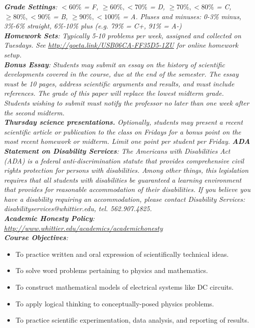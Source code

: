 \documentclass[10pt]{article}
\begin{document}
\textit{\textbf{Grade Settings}: $<60\%$ = F, $\geq 60\%, <70\%$ = D, $\geq 70\%, <80\%$ = C, $\geq 80\%, <90\%$ = B, $\geq 90\%, <100\%$ = A.  Pluses and minuses: 0-3\% minus, 3\%-6\% straight, 6\%-10\% plus (e.g. 79\% = C+, 91\% = A-)} \\
\textit{\textbf{Homework Sets}: Typically 5-10 problems per week, assigned and collected on Tuesdays.  See \url{http://goeta.link/USB06CA-FF35D5-1ZU} for online homework setup.} \\
\textit{\textbf{Bonus Essay}: Students may submit an essay on the history of scientific developments covered in the course, due at the end of the semester. The essay must be 10 pages, address scientific arguments and results, and must include references. The grade of this paper will replace the lowest midterm grade. Students wishing to submit must notify the professor no later than one week after the second midterm.} \\
\textit{\textbf{Thursday science presentations.} Optionally, students may present a recent scientific article or publication to the class on Fridays for a bonus point on the most recent homework or midterm. Limit one point per student per Friday.}
\textit{\textbf{ADA Statement on Disability Services}: The Americans with Disabilities Act (ADA) is a federal anti-discrimination statute that provides comprehensive civil rights protection for persons with disabilities. Among other things, this legislation requires that all students with disabilities be guaranteed a learning environment that provides for reasonable accommodation of their disabilities. If you believe you have a disability requiring an accommodation, please contact Disability Services: disabilityservices@whittier.edu, tel. 562.907.4825.} \\
\textit{\textbf{Academic Honesty Policy}: \url{http://www.whittier.edu/academics/academichonesty}} \\
\textit{\textbf{Course Objectives}:}
\begin{itemize}
\item To practice written and oral expression of scientifically technical ideas.
\item To solve word problems pertaining to physics and mathematics.
\item To construct mathematical models of electrical systems like DC circuits.
\item To apply logical thinking to conceptually-posed physics problems.
\item To practice scientific experimentation, data analysis, and reporting of results.
\end{itemize}
\end{document}
